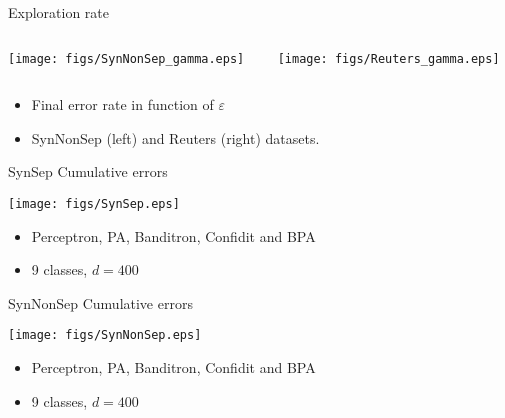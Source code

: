 \documentclass{beamer}
\begin{document}
\begin{frame}{Exploration rate}
		\begin{columns}
			\begin{column}{.5\linewidth}
				\centerline{\texttt{[image: figs/SynNonSep\_gamma.eps]}}
			\end{column}
			\begin{column}{.5\linewidth}
				\centerline{\texttt{[image: figs/Reuters\_gamma.eps]}}
			\end{column}	
		\end{columns}
		
		\begin{itemize}
			\item Final error rate in function of $\varepsilon$
			\item SynNonSep (left) and Reuters (right) datasets.
		\end{itemize}
		
		
\end{frame}

\begin{frame}{SynSep Cumulative errors }
			
	\centerline{
		\texttt{[image: figs/SynSep.eps]}
	}
	
			
	\begin{footnotesize}
		\begin{itemize}
			\item Perceptron, PA, Banditron, Confidit and BPA
			\item 9 classes, $d = 400$
		\end{itemize}
	\end{footnotesize}
	
\end{frame}

\begin{frame}{SynNonSep Cumulative errors }
	
			\centerline{
				\texttt{[image: figs/SynNonSep.eps]}
			}
	
	\begin{footnotesize}
		\begin{itemize}
			\item Perceptron, PA, Banditron, Confidit and BPA
			\item 9 classes, $d = 400$
		\end{itemize}
	\end{footnotesize}
	
\end{frame}
\end{document}
